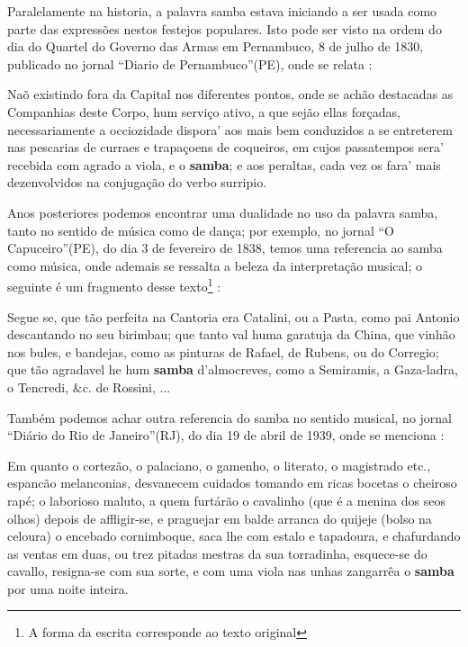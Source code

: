 Paralelamente na historia, a palavra samba estava iniciando a ser usada como parte
das expressões nestos festejos populares. 
Isto pode ser visto na ordem do dia do Quartel do Governo das Armas em
Pernambuco, 8 de julho de 1830, publicado no jornal ``Diario de Pernambuco''(PE), 
onde se  relata \cite[pp. 3]{sambadiariodepernanbuco}:
\begin{tcolorbox}[breakable,colback=colorlowgray,colframe=colorlowgray]%
Naõ existindo fora da Capital nos diferentes pontos,
onde se achão destacadas as Companhias deste Corpo, 
hum serviço ativo, a que sejão ellas forçadas, 
necessariamente a occiozidade dispora' 
aos mais bem conduzidos a se entreterem nas pescarias de curraes e trapaçoens de coqueiros,
em cujos passatempos sera' recebida com agrado a viola, e o \textbf{samba};
e aos peraltas, cada vez os fara' mais dezenvolvidos na conjugação do verbo surripio.
\end{tcolorbox}
Anos posteriores podemos encontrar uma dualidade no uso da palavra samba, 
tanto no sentido de música como de dança; por exemplo, no jornal ``O Capuceiro''(PE),
do dia 3 de fevereiro de 1838, temos uma referencia ao samba como música,
onde ademais se ressalta a beleza da interpretação musical;
o seguinte é um fragmento desse texto\footnote{\label{footort2}A forma da escrita corresponde ao texto original} \cite[pp. 1]{sambaperiodicoocapuceiro}:
\begin{tcolorbox}[breakable,colback=colorlowgray,colframe=colorlowgray]%
Segue se, que tão perfeita na Cantoria era Catalini, ou a Pasta,
como pai Antonio descantando no seu birimbau; que tanto val huma garatuja da China,
que vinhão nos bules, e bandejas,
como as pinturas de Rafael, de Rubens, ou do Corregio;
que tão agradavel he hum \textbf{samba} d'almocreves, como a Semiramis,
a Gaza-ladra, o Tencredi, \&c. de Rossini, ...
\end{tcolorbox}
Também podemos achar outra referencia do samba no sentido musical, no jornal ``Diário do Rio de Janeiro''(RJ),
do dia 19 de abril de 1939, onde se menciona \cite[pp. 1]{sambadiariorj1}:
\begin{tcolorbox}[breakable,colback=colorlowgray,colframe=colorlowgray]%
Em quanto o cortezão, o palaciano, o gamenho, o literato, o magistrado etc., 
espancão melanconias, desvanecem cuidados tomando em ricas bocetas o cheiroso rapé;
o laborioso maluto, a quem furtárão o cavalinho (que é a menina dos seos olhos)
depois de affligir-se, e praguejar em balde arranca do quijeje (bolso na celoura)
o encebado cornimboque, saca lhe com estalo e tapadoura, e chafurdando as ventas em duas,
ou trez pitadas mestras da sua torradinha, esquece-se do cavallo, resigna-se com sua sorte,
e com uma viola nas unhas zangarrêa o \textbf{samba} por uma noite inteira.
\end{tcolorbox}
